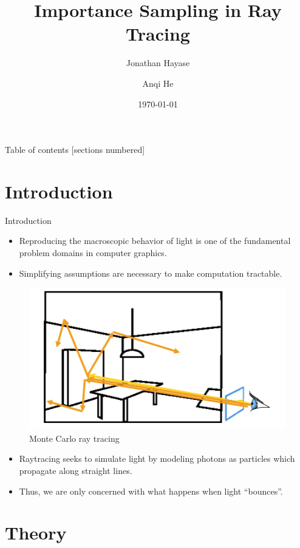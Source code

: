 \documentclass[10pt]{beamer}
\title{Importance Sampling in Ray Tracing}
\subtitle{}
\date{\today}
\author{Jonathan Hayase \and Anqi He}
\institute{Math 164 -- Scientific Computing -- FA18}
\begin{document}
\maketitle

\begin{frame}{Table of contents}
  [sections numbered]
  \tableofcontents[hideallsubsections]
\end{frame}

\section{Introduction}

\begin{frame}{Introduction}
  \begin{itemize}
  \item Reproducing the macroscopic behavior of light is one of the fundamental problem domains in computer graphics.
  \item Simplifying assumptions are necessary to make computation tractable.
  \end{itemize}
\end{frame}

\begin{frame}
\begin{figure}[H]
  \centering
    \includegraphics[width=0.5\linewidth,height=0.5\textheight,keepaspectratio]{intro.png}
    \caption{Monte Carlo ray tracing}
\end{figure}
\begin{itemize}
  \item Raytracing seeks to simulate light by modeling photons as particles which propagate along straight lines.
  \item Thus, we are only concerned with what happens when light ``bounces''.
\end{itemize}
\end{frame}

\section{Theory}
\end{document}

